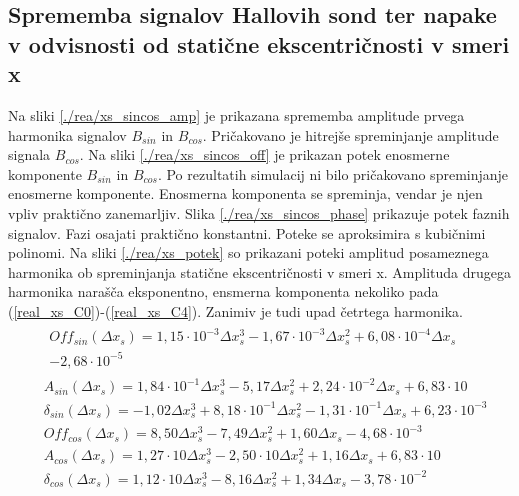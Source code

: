 \subsection{Sprememba signalov Hallovih sond ter napake v odvisnosti od statične ekscentričnosti v smeri x}
Na sliki \ref{./rea/xs_sincos_amp} je prikazana sprememba amplitude prvega harmonika signalov $B_{sin}$ in $B_{cos}$. Pričakovano je hitrejše spreminjanje amplitude signala $B_{cos}$. Na sliki \ref{./rea/xs_sincos_off} je prikazan potek enosmerne komponente $B_{sin}$ in $B_{cos}$. Po rezultatih simulacij ni bilo pričakovano spreminjanje enosmerne komponente. Enosmerna komponenta se spreminja, vendar je njen vpliv praktično zanemarljiv. Slika \ref{./rea/xs_sincos_phase} prikazuje potek faznih signalov. Fazi osajati praktično konstantni.
\newpage
Poteke se aproksimira s kubičnimi polinomi.
Na sliki \ref{./rea/xs_potek} so prikazani poteki amplitud posameznega harmonika ob spreminjanja statične ekscentričnosti v smeri x. Amplituda drugega harmonika narašča eksponentno, ensmerna komponenta nekoliko pada (\ref{real_xs_C0})-(\ref{real_xs_C4}). Zanimiv je tudi upad četrtega harmonika.
\begin{eqnarray}
&\begin{split}
Off_{sin}(\Delta x_s) =1,15\cdot 10^{-3}\Delta x_s^{3}-1,67\cdot 10^{-3}\Delta x_s^{2}+6,08\cdot 10^{-4}\Delta x_s\\-2,68\cdot 10^{-5}
\end{split}\\
&A_{sin}(\Delta x_s) =1,84\cdot 10^{-1}\Delta x_s^{3}-5,17\Delta x_s^{2}+2,24\cdot 10^{-2}\Delta x_s+6,83\cdot 10 \\                    
&\delta_{sin}(\Delta x_s) =-1,02\Delta x_s^{3}+8,18\cdot 10^{-1}\Delta x_s^{2}-1,31\cdot 10^{-1}\Delta x_s+6,23\cdot 10^{-3} \\             
&Off_{cos}(\Delta x_s) =8,50\Delta x_s^{3}-7,49\Delta x_s^{2}+1,60\Delta x_s-4,68\cdot 10^{-3} \\                                       
&A_{cos}(\Delta x_s) =1,27\cdot 10\Delta x_s^{3}-2,50\cdot 10\Delta x_s^{2}+1,16\Delta x_s+6,83\cdot 10 \\                              
&\delta_{cos}(\Delta x_s) =1,12\cdot 10\Delta x_s^{3}-8,16\Delta x_s^{2}+1,34\Delta x_s-3,78\cdot 10^{-2}
\end{eqnarray}
